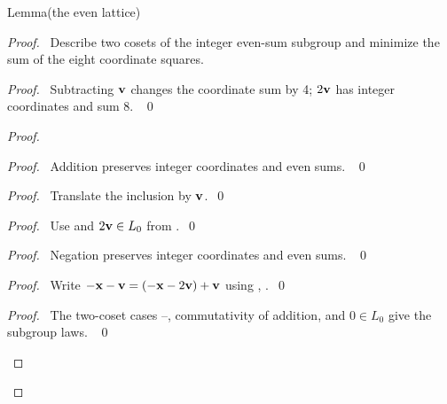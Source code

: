 \begin{namedresult}{Lemma}{(the even lattice)}\label{lem:even-lattice}
\end{namedresult}
\begin{proof}
\pfsketch\ Describe two cosets of the integer even-sum subgroup and
minimize the sum of the eight coordinate squares.
\begin{proof}\pf\ Subtracting ${\mathbf v}$ changes the coordinate sum by 4;
$2{\mathbf v}$ has integer coordinates and sum 8. ~\qed\end{proof}
\begin{proof}
\begin{proof}\pf\ Addition preserves integer coordinates and even sums. ~\qed\end{proof}
\begin{proof}\pf\ Translate the inclusion  by ${\mathbf v}$.~\qed\end{proof}
\begin{proof}\pf\ Use  and $2{\mathbf v}\in L_0$ from
.~\qed\end{proof}
\begin{proof}\pf\ Negation preserves integer coordinates and even sums. ~\qed\end{proof}
\begin{proof}\pf\ Write $-{\mathbf x}-{\mathbf v}=(-{\mathbf x}-2{\mathbf v})+{\mathbf v}$ using
, .~\qed\end{proof}
\qedstep
\begin{proof}\pf\ The two-coset cases --,
commutativity of addition, and $0\in L_0$ give the subgroup laws. ~\qed\end{proof}
\end{proof}

\end{proof}
